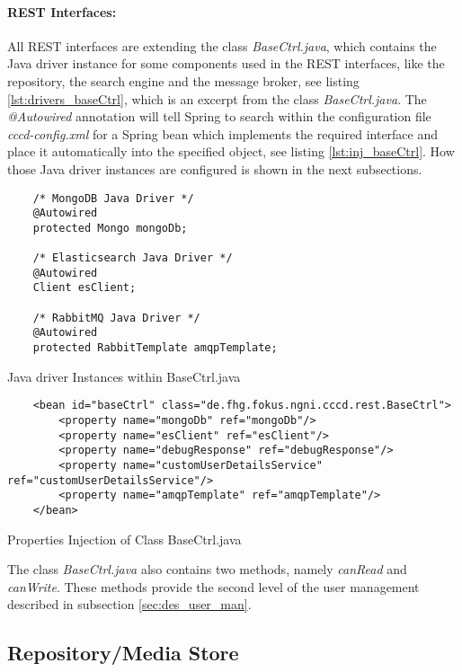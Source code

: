 \paragraph{REST Interfaces:} All REST interfaces are extending the class \textit{BaseCtrl.java}, which contains the Java driver instance for some components used in the REST interfaces, like the repository, the search engine and the message broker, see listing \ref{lst:drivers_baseCtrl}, which is an excerpt from the class \textit{BaseCtrl.java}. The \textit{@Autowired} annotation will tell Spring to search within the configuration file \textit{cccd-config.xml} for a Spring bean which implements the required interface and place it automatically into the specified object, see listing \ref{lst:inj_baseCtrl}. How those Java driver instances are configured is shown in the next subsections.
\begin{code}
\begin{verbatim}
	/* MongoDB Java Driver */
	@Autowired
	protected Mongo mongoDb;
	
	/* Elasticsearch Java Driver */
	@Autowired
	Client esClient;
	
	/* RabbitMQ Java Driver */
	@Autowired
	protected RabbitTemplate amqpTemplate;
\end{verbatim}
\caption{Java driver Instances within BaseCtrl.java}
\label{lst:drivers_baseCtrl}
\end{code}

\begin{code}
\begin{verbatim}
	<bean id="baseCtrl" class="de.fhg.fokus.ngni.cccd.rest.BaseCtrl">
	   	<property name="mongoDb" ref="mongoDb"/>
	   	<property name="esClient" ref="esClient"/>
	   	<property name="debugResponse" ref="debugResponse"/>
	   	<property name="customUserDetailsService" ref="customUserDetailsService"/>
	   	<property name="amqpTemplate" ref="amqpTemplate"/>
	</bean>
\end{verbatim}
\caption{Properties Injection of Class BaseCtrl.java}
\label{lst:inj_baseCtrl}
\end{code}

The class \textit{BaseCtrl.java} also contains two methods, namely \textit{canRead} and \textit{canWrite}. These methods provide the second level of the user management described in subsection \ref{sec:des_user_man}.

\subsection{Repository/Media Store\label{sec:impl_repo}}

